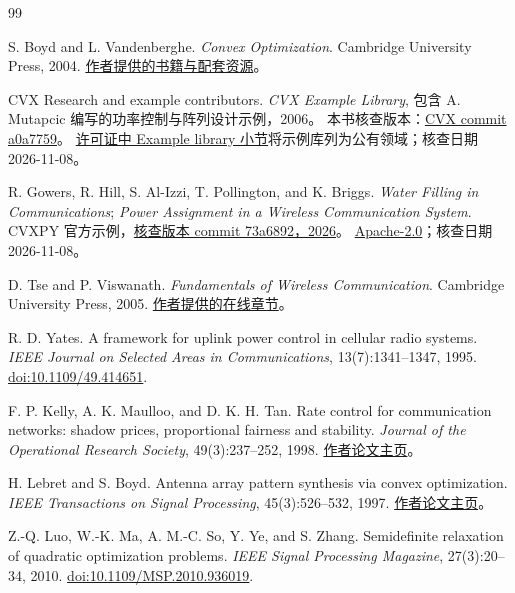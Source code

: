 \begin{thebibliography}{99}
\small

S. Boyd and L. Vandenberghe.
\emph{Convex Optimization}. Cambridge University Press, 2004.
\href{https://web.stanford.edu/~boyd/cvxbook/}{作者提供的书籍与配套资源}。

CVX Research and example contributors.
\emph{CVX Example Library}, 包含 A. Mutapcic 编写的功率控制与阵列设计示例，2006。
本书核查版本：\href{https://github.com/cvxr/CVX/tree/a0a775908bc1eec1625d56498d0224132b0d8b7f/examples}{CVX commit a0a7759}。
\href{https://github.com/cvxr/CVX/blob/a0a775908bc1eec1625d56498d0224132b0d8b7f/LICENSE.txt}{许可证中 Example library 小节}将示例库列为公有领域；核查日期 2026-11-08。

R. Gowers, R. Hill, S. Al-Izzi, T. Pollington, and K. Briggs.
\emph{Water Filling in Communications};
\emph{Power Assignment in a Wireless Communication System}.
CVXPY 官方示例，\href{https://github.com/cvxpy/examples/tree/73a6892ef5bea4ded68f8f9fab17e48119dc62f5/notebooks/WWW}{核查版本 commit 73a6892，2026}。
\href{https://github.com/cvxpy/examples/blob/73a6892ef5bea4ded68f8f9fab17e48119dc62f5/LICENSE}{Apache-2.0}；核查日期 2026-11-08。

D. Tse and P. Viswanath.
\emph{Fundamentals of Wireless Communication}.
Cambridge University Press, 2005.
\href{https://web.stanford.edu/~dntse/wireless_book.html}{作者提供的在线章节}。

R. D. Yates.
A framework for uplink power control in cellular radio systems.
\emph{IEEE Journal on Selected Areas in Communications}, 13(7):1341--1347, 1995.
\href{https://doi.org/10.1109/49.414651}{doi:10.1109/49.414651}.

F. P. Kelly, A. K. Maulloo, and D. K. H. Tan.
Rate control for communication networks: shadow prices, proportional fairness and stability.
\emph{Journal of the Operational Research Society}, 49(3):237--252, 1998.
\href{https://www.statslab.cam.ac.uk/~fpk1/rate.html}{作者论文主页}。

H. Lebret and S. Boyd.
Antenna array pattern synthesis via convex optimization.
\emph{IEEE Transactions on Signal Processing}, 45(3):526--532, 1997.
\href{https://web.stanford.edu/~boyd/papers/ant-pat.html}{作者论文主页}。

Z.-Q. Luo, W.-K. Ma, A. M.-C. So, Y. Ye, and S. Zhang.
Semidefinite relaxation of quadratic optimization problems.
\emph{IEEE Signal Processing Magazine}, 27(3):20--34, 2010.
\href{https://doi.org/10.1109/MSP.2010.936019}{doi:10.1109/MSP.2010.936019}.


\end{thebibliography}
